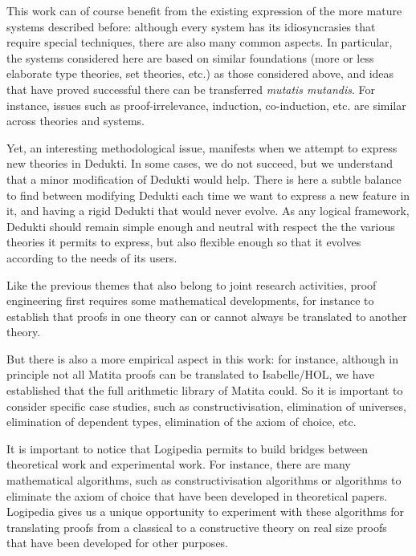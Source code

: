 This work can of course benefit from the existing expression of the
more mature systems described before: although every system has its
idiosyncrasies that require special techniques, there are also many
common aspects. In particular, the systems considered here are based
on similar foundations (more or less elaborate type theories, set
theories, etc.) as those considered above, and ideas that have proved
successful there can be transferred {\em mutatis mutandis}. For
instance, issues such as proof-irrelevance, induction, co-induction,
etc. are similar across theories and systems.

Yet, an interesting methodological issue, manifests when we attempt to
express new theories in Dedukti. In some cases, we do not succeed, but
we understand that a minor modification of Dedukti would help. There
is here a subtle balance to find between modifying Dedukti each time
we want to express a new feature in it, and having a rigid Dedukti
that would never evolve. As any logical framework, Dedukti should
remain simple enough and neutral with respect the the various theories
it permits to express, but also flexible enough so that it evolves
according to the needs of its users.


Like the previous themes that also belong to joint research activities,
proof engineering first requires some mathematical developments, for
instance to establish that proofs in one theory can or cannot always
be translated to another theory.

But there is also a more empirical aspect in this work: for instance,
although in principle not all Matita proofs can be translated to
Isabelle/HOL, we have established that the full arithmetic library of
Matita could. So it is important to consider specific case studies,
such as constructivisation, elimination of universes, elimination of
dependent types, elimination of the axiom of choice, etc.

It is important to notice that Logipedia permits to build bridges
between theoretical work and experimental work. For instance, there
are many mathematical algorithms, such as constructivisation
algorithms or algorithms to eliminate the axiom of choice that have
been developed in theoretical papers. Logipedia gives us a unique
opportunity to experiment with these algorithms for translating proofs
from a classical to a constructive theory on real size proofs that
have been developed for other purposes.

